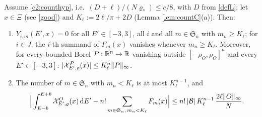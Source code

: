\begin{lemma}\label{lem:local}
Assume \eqref{c2:counthyp}, i.e.\ $(D+\ell)/(N\varrho_*)\le c/8$, with $D$ from \eqref{defL}; let $x\in\Xi$ (see \eqref{good}) and $K_\ell:=2\ell/\pi+2D$ (Lemma \ref{lem:countC}(a)). Then:
\begin{enumerate}[label=(\alph*),itemsep=1pt]
\item $Y_{i,m}(E',x)=0$ for all $E'\in[-3,3]$, all $i$ and all $m\in\mathfrak S_n$ with $m_n\ge K_\ell$; for $i\in J$, the $i$-th summand of $F_m(x)$ vanishes whenever $m_n\ge K_\ell$.
Moreover, for every bounded Borel $P:\mathbb{R}^n\to\mathbb{R}$ vanishing outside $[-\rho_O,\rho_O]^n$ and every $E'\in[-3,3]$: $|\mathcal{X}^P_{E',\varrho}(x)|\le K_\ell^n\|P\|_\infty$.
\item The number of $m\in\mathfrak S_n$ with $m_n<K_\ell$ is at most $K_\ell^{n-1}$, and
\[
\Big|\int_{E-b}^{E+b}\mathcal{X}^O_{E',\varrho}(x)\,\mathrm{d} E'-n!\sum_{m\in\mathfrak S_n,\,m_n<K_\ell}F_m(x)\Big|\le n!\,|\mathcal B|\,K_\ell^{n-1}\,\frac{2\ell\|O\|_\infty}{N}.
\]
\end{enumerate}
\end{lemma}

